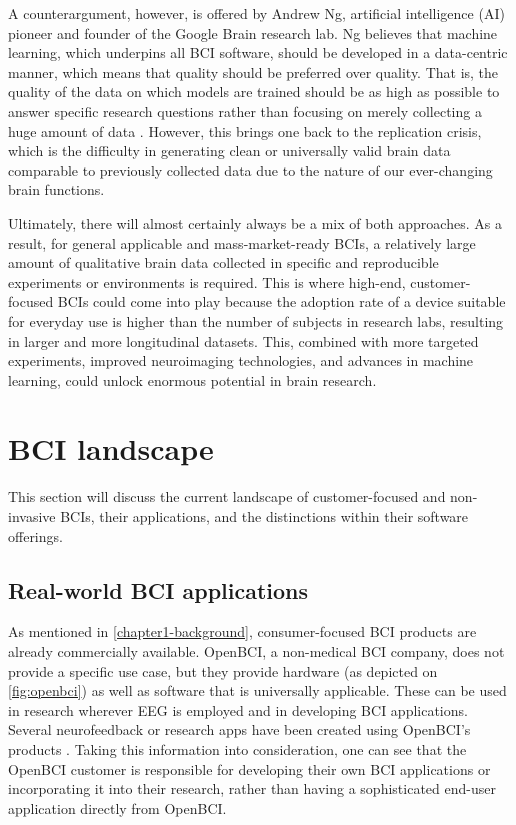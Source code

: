 A counterargument, however, is offered by Andrew Ng, artificial intelligence (AI) pioneer and founder of the Google Brain research lab. Ng believes that machine learning, which underpins all BCI software, should be developed in a data-centric manner, which means that quality should be preferred over quality. That is, the quality of the data on which models are trained should be as high as possible to answer specific research questions rather than focusing on merely collecting a huge amount of data \citep{brown_why_2022}. However, this brings one back to the replication crisis, which is the difficulty in generating clean or universally valid brain data comparable to previously collected data due to the nature of our ever-changing brain functions.

Ultimately, there will almost certainly always be a mix of both approaches. As a result, for general applicable and mass-market-ready BCIs, a relatively large amount of qualitative brain data collected in specific and reproducible experiments or environments is required. This is where high-end, customer-focused BCIs could come into play because the adoption rate of a device suitable for everyday use is higher than the number of subjects in research labs, resulting in larger and more longitudinal datasets. This, combined with more targeted experiments, improved neuroimaging technologies, and advances in machine learning, could unlock enormous potential in brain research.

\section{BCI landscape}
\label{chapter2-research-landscape}

This section will discuss the current landscape of customer-focused and non-invasive BCIs, their applications, and the distinctions within their software offerings.

\subsection{Real-world BCI applications}
\label{chapter2-real-world-bci-applications}

As mentioned in \autoref{chapter1-background}, consumer-focused BCI products are already commercially available. OpenBCI, a non-medical BCI company, does not provide a specific use case, but they provide hardware (as depicted on \autoref{fig:openbci}) as well as software that is universally applicable. These can be used in research wherever EEG is employed and in developing BCI applications. Several neurofeedback or research apps have been created using OpenBCI’s products \citep{openbci_openbci_nodate}. Taking this information into consideration, one can see that the OpenBCI customer is responsible for developing their own BCI applications or incorporating it into their research, rather than having a sophisticated end-user application directly from OpenBCI.

